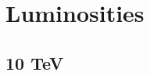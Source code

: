 \documentclass[a4paper,11pt]{article}
\begin{document}

%
%
%

\clearpage
\section{Luminosities}

\subsection{10 TeV}

\end{document}
